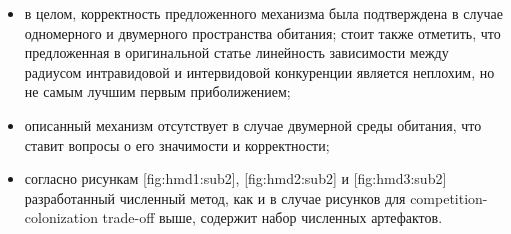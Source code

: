 \begin{itemize}
	\item в целом, корректность предложенного механизма была подтверждена в случае одномерного и двумерного пространства обитания; стоит также отметить, что предложенная в оригинальной статье линейность зависимости между радиусом интравидовой и интервидовой конкуренции является неплохим, но не самым лучшим первым приболижением; 
	
	\item описанный механизм отсутствует в случае двумерной среды обитания, что ставит вопросы о его значимости и корректности; 
	
	\item согласно рисункам [fig:hmd1:sub2], [fig:hmd2:sub2] и [fig:hmd3:sub2] разработанный численный метод, как и в случае рисунков для competition-colonization trade-off выше, содержит набор численных артефактов.
\end{itemize}

